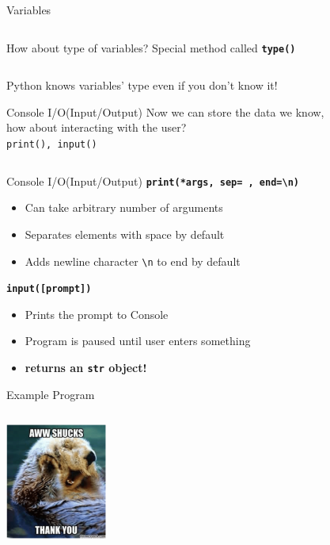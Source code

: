 		\begin{frame}{Variables}
			\inputminted[frame=single,framesep=2pt,fontsize=\LARGE]{python3}{code-examples/variables.py}
		\end{frame}
		
		\begin{frame}{How about type of variables?}
			\LARGE
			Special method called \texttt{\textbf{type()}} 
			\inputminted[frame=single,framesep=2pt]{python3}{code-examples/types.py}
			Python knows variables' type even if you don't know it!
		\end{frame}

		\begin{frame}{Console I/O(Input/Output)}
			\LARGE
			Now we can store the data we know, \\
			\pause
			how about interacting with the user? \\
			\pause
			\texttt{print(), input()}
			\pause
			\inputminted[frame=single,framesep=2pt]{python3}{code-examples/io.py}
		\end{frame}

		\begin{frame}{Console I/O(Input/Output)}
			\huge
			\textbf{\texttt{print(*args, sep=\textquotesingle \ \textquotesingle, end=\textquotesingle \textbackslash n\textquotesingle )}}
			\pause
			\begin{itemize}
				\LARGE
				\item Can take arbitrary number of arguments
				\pause
				\item Separates elements with space by default
				\pause
				\item Adds newline character \texttt{\textquotesingle \textbackslash n\textquotesingle} to end by default
			\end{itemize}
			
			\pause
			\textbf{\texttt{input([prompt])}}
			\pause
			\begin{itemize}
				\LARGE
				\item Prints the prompt to Console
				\pause
				\item Program is paused until user enters something
				\pause
				\item \textbf{returns an \texttt{str} object!} 
			\end{itemize}
		\end{frame}

		\begin{frame}{Example Program}
			\inputminted[frame=single,framesep=2pt,fontsize=\LARGE]{python3}{code-examples/example_io.py}
			\pause
			\centering
			\includegraphics[width=0.25\textwidth]{images/thanks.png}

		\end{frame}
		
